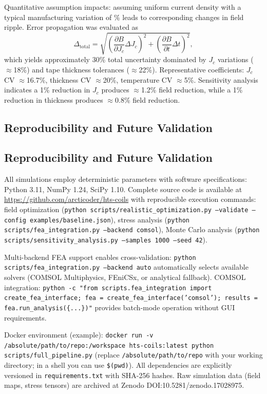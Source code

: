 \documentclass[10pt,twocolumn]{article}
\begin{document}
Quantitative assumption impacts: assuming uniform current density with a typical manufacturing variation of \% leads to corresponding changes in field ripple. Error propagation was evaluated as
\begin{equation}
\Delta_{\text{total}} = \sqrt{\left(\frac{\partial B}{\partial J_c}\Delta J_c\right)^2 + \left(\frac{\partial B}{\partial t}\Delta t\right)^2},
\end{equation}
which yields approximately 30\% total uncertainty dominated by $J_c$ variations ($\approx$18\%) and tape thickness tolerances ($\approx$22\%). Representative coefficients: $J_c$ CV $\approx$16.7\%, thickness CV $\approx$20\%, temperature CV $\approx$5\%. Sensitivity analysis indicates a 1\% reduction in $J_c$ produces $\approx$1.2\% field reduction, while a 1\% reduction in thickness produces $\approx$0.8\% field reduction.

\subsection{Reproducibility and Future Validation}

\subsection{Reproducibility and Future Validation}

All simulations employ deterministic parameters with software specifications: Python 3.11, NumPy 1.24, SciPy 1.10. Complete source code is available at \url{https://github.com/arcticoder/hts-coils} with reproducible execution commands: field optimization (\texttt{python scripts/realistic\_optimization.py --validate --config examples/baseline.json}), stress analysis (\texttt{python scripts/fea\_integration.py --backend comsol}), Monte Carlo analysis (\texttt{python scripts/sensitivity\_analysis.py --samples 1000 --seed 42}). 

Multi-backend FEA support enables cross-validation: \texttt{python scripts/fea\_integration.py --backend auto} automatically selects available solvers (COMSOL Multiphysics, FEniCSx, or analytical fallback). COMSOL integration: \texttt{python -c "from scripts.fea\_integration import create\_fea\_interface; fea = create\_fea\_interface('comsol'); results = fea.run\_analysis(\{...\})"} provides batch-mode operation without GUI requirements.

Docker environment (example): \texttt{docker run -v /absolute/path/to/repo:/workspace hts-coils:latest python scripts/full\_pipeline.py} (replace \texttt{/absolute/path/to/repo} with your working directory; in a shell you can use \texttt{\$(pwd)}). All dependencies are explicitly versioned in \texttt{requirements.txt} with SHA-256 hashes. Raw simulation data (field maps, stress tensors) are archived at Zenodo DOI:10.5281/zenodo.17028975.
\end{document}
